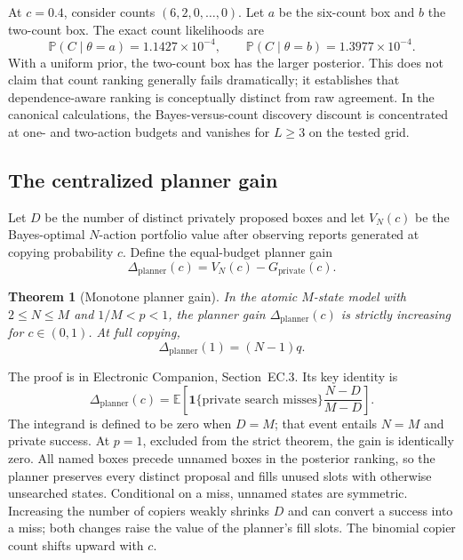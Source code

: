 \documentclass[11pt]{article}
\newtheorem{theorem}{Theorem}
\theoremstyle{definition}
\theoremstyle{remark}
\newcommand{\E}{\mathbb{E}}
\newcommand{\Prob}{\mathbb{P}}
\newcommand{\1}{\mathbf{1}}
\newcommand{\priv}{\mathrm{private}}
\newcommand{\plan}{\mathrm{planner}}
\begin{document}
At $c=0.4$, consider counts $(6,2,0,\ldots,0)$. Let $a$ be the six-count box and $b$ the two-count box. The exact count likelihoods are
\[
\Prob(C\mid\theta=a)=1.1427\times10^{-4},
\qquad
\Prob(C\mid\theta=b)=1.3977\times10^{-4}.
\]
With a uniform prior, the two-count box has the larger posterior. This does not claim that count ranking generally fails dramatically; it establishes that dependence-aware ranking is conceptually distinct from raw agreement. In the canonical calculations, the Bayes-versus-count discovery discount is concentrated at one- and two-action budgets and vanishes for $L\ge3$ on the tested grid.

\subsection{The centralized planner gain}

Let $D$ be the number of distinct privately proposed boxes and let $V_N(c)$ be the Bayes-optimal $N$-action portfolio value after observing reports generated at copying probability $c$. Define the equal-budget planner gain
\begin{equation}
\Delta_{\plan}(c)=V_N(c)-G_{\priv}(c).
\label{eq:planner-gain}
\end{equation}

\begin{theorem}[Monotone planner gain]
In the atomic $M$-state model with $2\le N\le M$ and $1/M<p<1$, the planner gain $\Delta_{\plan}(c)$ is strictly increasing for $c\in(0,1)$. At full copying,
\begin{equation}
\Delta_{\plan}(1)=(N-1)q.
\label{eq:planner-limit}
\end{equation}
\end{theorem}

The proof is in Electronic Companion, Section~EC.3. Its key identity is
\begin{equation}
\Delta_{\plan}(c)
=\E\left[\1\{\text{private search misses}\}\frac{N-D}{M-D}\right].
\label{eq:fill-identity}
\end{equation}
The integrand is defined to be zero when $D=M$; that event entails $N=M$ and private success. At $p=1$, excluded from the strict theorem, the gain is identically zero. All named boxes precede unnamed boxes in the posterior ranking, so the planner preserves every distinct proposal and fills unused slots with otherwise unsearched states. Conditional on a miss, unnamed states are symmetric. Increasing the number of copiers weakly shrinks $D$ and can convert a success into a miss; both changes raise the value of the planner's fill slots. The binomial copier count shifts upward with $c$.
\end{document}
